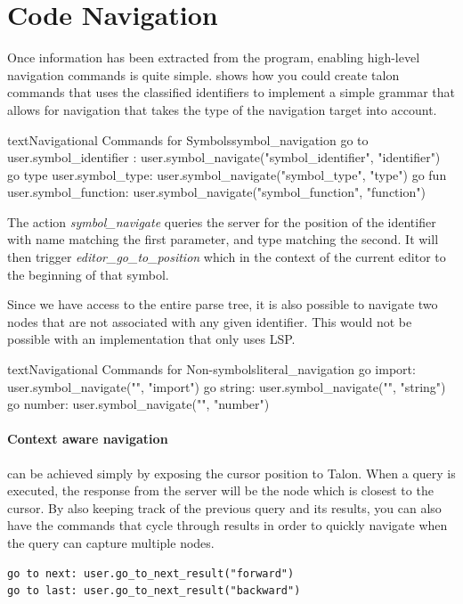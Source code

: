 \documentclass[../thesis.tex]{subfiles}
\begin{document}
\section{Code Navigation}%
\label{sec:code_navigation}
Once information has been extracted from the program, enabling high-level navigation commands is quite simple.
 shows how you could create talon commands that uses the classified identifiers
to implement a simple grammar that allows for navigation that takes the type of the navigation target
into account.
\begin{code}{text}{Navigational Commands for Symbols}{symbol_navigation}
go to { user.symbol_identifier }:
    user.symbol_navigate("{symbol_identifier}", "identifier")
go type {user.symbol_type}:
    user.symbol_navigate("{symbol_type}", "type")
go fun {user.symbol_function}:
    user.symbol_navigate("{symbol_function}", "function")
\end{code}
The action \textit{symbol\_navigate} queries the server
for the position of the identifier with name matching the first parameter, and type matching the second.
It will then trigger \textit{editor\_go\_to\_position} which in the context of the current editor
to the beginning of that symbol.

Since we have access to the entire parse tree, it is also possible to navigate two nodes that
are not associated with any given identifier.
This would not be possible with an implementation that only uses LSP.
\begin{code}{text}{Navigational Commands for Non-symbols}{literal_navigation}
go import: user.symbol_navigate("", "import")
go string: user.symbol_navigate("", "string")
go number: user.symbol_navigate("", "number")
\end{code}

\paragraph{Context aware navigation}
can be achieved simply by exposing the cursor position to Talon.
When a query is executed, the response from the server will be the node
which is closest to the cursor. By also keeping track of
the previous query and its results, you can also have
the commands that cycle through results in order to quickly navigate
when the query can capture multiple nodes.
\begin{verbatim}
go to next: user.go_to_next_result("forward")
go to last: user.go_to_next_result("backward")
\end{verbatim}
\end{document}
